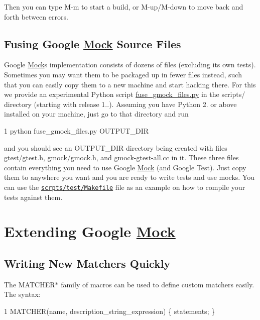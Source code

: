 Then you can type {\ttfamily M-\/m} to start a build, or {\ttfamily M-\/up}/{\ttfamily M-\/down} to move back and forth between errors.

\subsection*{Fusing Google \hyperlink{class_mock}{Mock} Source Files}

Google \hyperlink{class_mock}{Mock}\textquotesingle{}s implementation consists of dozens of files (excluding its own tests). Sometimes you may want them to be packaged up in fewer files instead, such that you can easily copy them to a new machine and start hacking there. For this we provide an experimental Python script {\ttfamily \hyperlink{fuse__gmock__files_8py}{fuse\+\_\+gmock\+\_\+files.\+py}} in the {\ttfamily scripts/} directory (starting with release 1..). Assuming you have Python 2. or above installed on your machine, just go to that directory and run 
\begin{DoxyCode}
1 python fuse\_gmock\_files.py OUTPUT\_DIR
\end{DoxyCode}


and you should see an {\ttfamily O\+U\+T\+P\+U\+T\+\_\+\+D\+IR} directory being created with files {\ttfamily gtest/gtest.\+h}, {\ttfamily gmock/gmock.\+h}, and {\ttfamily gmock-\/gtest-\/all.\+cc} in it. These three files contain everything you need to use Google \hyperlink{class_mock}{Mock} (and Google Test). Just copy them to anywhere you want and you are ready to write tests and use mocks. You can use the \href{http://code.google.com/p/googlemock/source/browse/trunk/scripts/test/Makefile}{\tt scrpts/test/\+Makefile} file as an example on how to compile your tests against them.

\section*{Extending Google \hyperlink{class_mock}{Mock}}

\subsection*{Writing New Matchers Quickly}

The {\ttfamily M\+A\+T\+C\+H\+E\+R$\ast$} family of macros can be used to define custom matchers easily. The syntax\+:


\begin{DoxyCode}
1 MATCHER(name, description\_string\_expression) \{ statements; \}
\end{DoxyCode}


